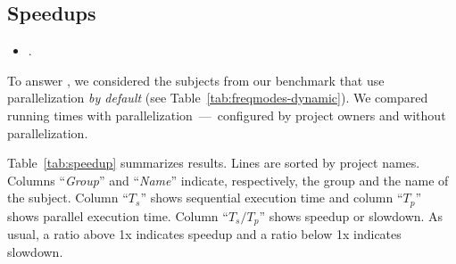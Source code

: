 \begin{center}
\vspace{1ex}
\vspace{1ex}
\end{center}

\subsection{Speedups}
\label{sec:rqD}

\begin{itemize}
    \item \numRQSpeedupOne{}. \textbf{\RQSpeedupOne}
\end{itemize}

To answer \numRQSpeedupOne{}, we considered the \numProjectsPar{}
subjects from our benchmark that use parallelization \emph{by default}
(see Table~\ref{tab:freqmodes-dynamic}).  We compared running times
with parallelization~---~configured by project owners and without
parallelization.


Table~\ref{tab:speedup} summarizes results.
Lines are sorted by project names.
Columns ``\emph{Group}'' and ``\emph{Name}'' indicate, respectively,
the group and the name of the subject.
Column ``$T_s$'' shows sequential execution time and column ``$T_p$''
shows parallel execution time.
Column ``$T_s/T_p$'' shows speedup or slowdown.
As usual, a ratio above 1x indicates speedup and a ratio below 1x
indicates slowdown.

